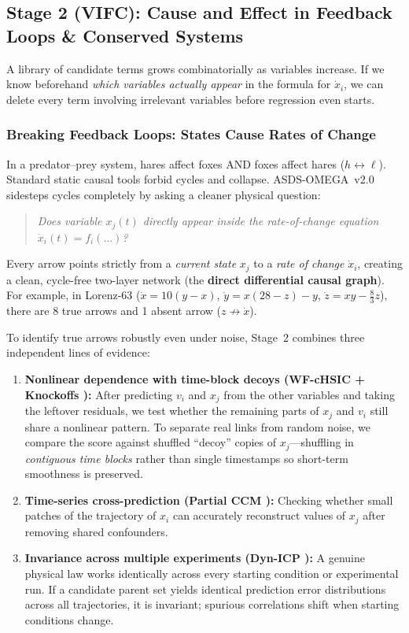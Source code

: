 \documentclass[11pt,a4paper]{article}
\begin{document}
\subsection{Stage 2 (VIFC): Cause and Effect in Feedback Loops \& Conserved Systems}
A library of candidate terms grows combinatorially as variables increase. If we know beforehand \emph{which variables actually appear} in the formula for $\dot{x}_i$, we can delete every term involving irrelevant variables before regression even starts.

\subsubsection{Breaking Feedback Loops: States Cause Rates of Change}
In a predator--prey system, hares affect foxes AND foxes affect hares ($h \leftrightarrow \ell$). Standard static causal tools forbid cycles and collapse. ASDS-OMEGA~v2.0 sidesteps cycles completely by asking a cleaner physical question:
\begin{quote}
\emph{Does variable $x_j(t)$ directly appear inside the rate-of-change equation $\dot{x}_i(t) = f_i(\dots)$?}
\end{quote}
Every arrow points strictly from a \emph{current state} $x_j$ to a \emph{rate of change} $\dot{x}_i$, creating a clean, cycle-free two-layer network (the \textbf{direct differential causal graph}). For example, in Lorenz-63 ($\dot{x} = 10(y-x)$, $\dot{y} = x(28-z)-y$, $\dot{z} = xy - \frac{8}{3}z$), there are 8 true arrows and 1 absent arrow ($z \not\to \dot{x}$).

To identify true arrows robustly even under noise, Stage~2 combines three independent lines of evidence:
\begin{enumerate}
  \item \textbf{Nonlinear dependence with time-block decoys (WF-cHSIC + Knockoffs \cite{candes2018panning}):} After predicting $v_i$ and $x_j$ from the other variables and taking the leftover residuals, we test whether the remaining parts of $x_j$ and $v_i$ still share a nonlinear pattern. To separate real links from random noise, we compare the score against shuffled ``decoy'' copies of $x_j$—shuffling in \emph{contiguous time blocks} rather than single timestamps so short-term smoothness is preserved.
  \item \textbf{Time-series cross-prediction (Partial CCM \cite{sugihara2012detecting}):} Checking whether small patches of the trajectory of $x_i$ can accurately reconstruct values of $x_j$ after removing shared confounders.
  \item \textbf{Invariance across multiple experiments (Dyn-ICP \cite{peters2016causal}):} A genuine physical law works identically across every starting condition or experimental run. If a candidate parent set yields identical prediction error distributions across all trajectories, it is invariant; spurious correlations shift when starting conditions change.
\end{enumerate}
\end{document}
